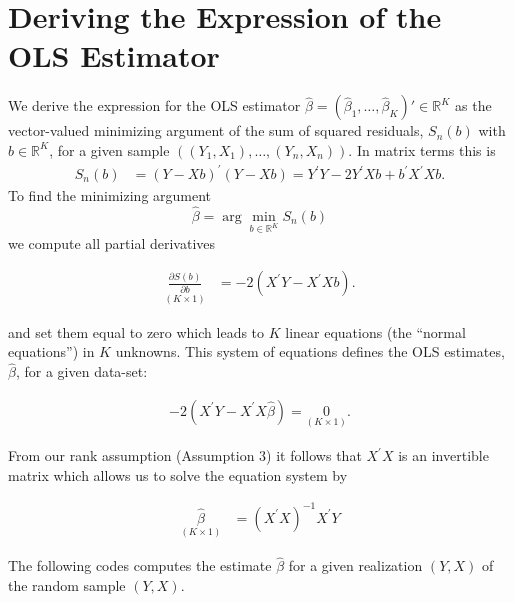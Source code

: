 \documentclass[
  letterpaper,
  DIV=11,
  numbers=noendperiod]{scrreprt}
\theoremstyle{definition}
\theoremstyle{plain}
\theoremstyle{plain}
\theoremstyle{remark}
\begin{document}
\hypertarget{deriving-the-expression-of-the-ols-estimator}{%
\section{Deriving the Expression of the OLS
Estimator}\label{deriving-the-expression-of-the-ols-estimator}}

We derive the expression for the OLS estimator
\(\hat\beta=(\hat\beta_1,\dots,\hat\beta_K)'\in\mathbb{R}^K\) as the
vector-valued minimizing argument of the sum of squared residuals,
\(S_n(b)\) with \(b\in\mathbb{R}^K\), for a given sample
\(((Y_1,X_1),\dots,(Y_n,X_n))\). In matrix terms this is \begin{align*}
S_n(b)&=(Y-X b)^{\prime}(Y-X b)=Y^{\prime}Y-2 Y^{\prime} X b+b^{\prime} X^{\prime} X b.
\end{align*} To find the minimizing argument
\[\hat\beta=\arg\min_{b\in\mathbb{R}^K}S_n(b)\] we compute all partial
derivatives

\[
\begin{aligned}
\underset{(K\times 1)}{\frac{\partial S(b)}{\partial b}} &=-2\left(X^{\prime}Y -X^{\prime} Xb\right).
\end{aligned}
\]

and set them equal to zero which leads to \(K\) linear equations (the
``normal equations'') in \(K\) unknowns. This system of equations
defines the OLS estimates, \(\hat{\beta}\), for a given data-set:

\[
\begin{aligned}
-2\left(X^{\prime}Y -X^{\prime} X\hat{\beta}\right)=\underset{(K\times 1)}{0}.
\end{aligned}
\]

From our rank assumption (Assumption 3) it follows that \(X^{\prime}X\)
is an invertible matrix which allows us to solve the equation system by

\[
\begin{aligned}
\underset{(K\times 1)}{\hat{\beta}} &=\left(X^{\prime} X\right)^{-1} X^{\prime} Y
\end{aligned}
\]

The following codes computes the estimate \(\hat{\beta}\) for a given
realization \((Y,X)\) of the random sample \((Y,X)\).
\end{document}
